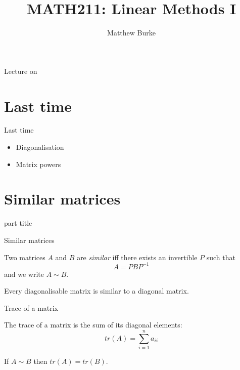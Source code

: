 \documentclass{beamer}
\title{MATH211: Linear Methods I}
\author{Matthew Burke}
\date{\lectureDate}
\newcommand{\lectureDate}{\formatdate{04}{12}{2018}}
\begin{document}
\frame{\titlepage}

\begin{frame}{Lecture on \lectureDate}
  \tableofcontents
\end{frame}

\section*{Last time}
\label{sec:Last-time}

\begin{frame}{Last time}
	\begin{itemize}
		\item Diagonalisation\vfill
		\item Matrix powers
	\end{itemize}
\end{frame}

\section{Similar matrices}

\begin{frame}
\begin{beamercolorbox}[sep=12pt,center]{part title}
\insertsection\par
\end{beamercolorbox}
\end{frame}

\begin{frame}{Similar matrices}
\begin{definition}
	Two matrices $A$ and $B$ are \emph{similar} iff there exists an invertible $P$ such that
	\begin{equation*}
	A = PBP^{-1}
	\end{equation*}
	and we write $A\sim B$.
\end{definition}\vfill
\begin{example}
	Every diagonalisable matrix is similar to a diagonal matrix.
\end{example}
\end{frame}

\begin{frame}{Trace of a matrix}
\begin{definition}
	The trace of a matrix is the sum of its diagonal elements:
	\begin{equation*}
	tr(A) = \sum_{i=1}^n a_{ii}
	\end{equation*}
\end{definition}
\begin{theorem}
	If $A\sim B$ then $tr(A) = tr(B)$.
\end{theorem}
\end{frame}
\end{document}
